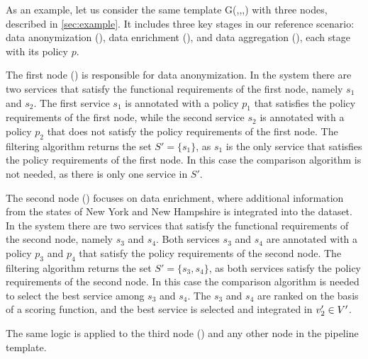 \begin{example}\label{ex:instance}

  As an example, let us consider the same template G(\V,\E,\myLambda,\myGamma) with three nodes, described in \cref{sec:example}.
  It includes three key stages in our reference scenario: data anonymization (), data enrichment (), and data aggregation (), each stage with its policy $p$.

  The first node () is responsible for data anonymization. In the system there are two services that satisfy the functional requirements of the first node, namely $s_1$ and $s_2$.
  The first service $s_1$ is annotated with a policy $p_1$ that satisfies the policy requirements of the first node, while the second service $s_2$ is annotated with a policy $p_2$ that does not satisfy the policy requirements of the first node.
  The filtering algorithm returns the set $S'=\{s_1\}$, as $s_1$ is the only service that satisfies the policy requirements of the first node.
  In this case the comparison algorithm is not needed, as there is only one service in $S'$.

  The second node () focuses on data enrichment, where additional information from the states of New York and New Hampshire is integrated into the dataset.
  In the system there are two services that satisfy the functional requirements of the second node, namely $s_3$ and $s_4$.
  Both services $s_3$ and $s_4$ are annotated with a policy $p_3$ and $p_4$ that satisfy the policy requirements of the second node.
  The filtering algorithm returns the set $S'=\{s_3,s_4\}$, as both services satisfy the policy requirements of the second node.
  In this case the comparison algorithm is needed to select the best service among $s_3$ and $s_4$.
  The $s_3$ and $s_4$ are ranked on the basis of a scoring function, and the best service is selected and integrated in $v'_{2}\in V'$.

  The same logic is applied to the third node () and any other node in the pipeline template.

\end{example}




